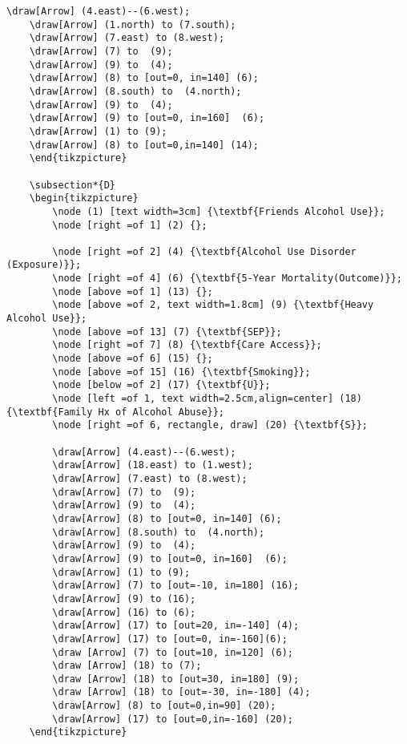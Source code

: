 \documentclass{article}
\begin{document}
\begin{lstlisting}[frame=single, basicstyle=\ttfamily, linewidth=22.5cm]
    \draw[Arrow] (4.east)--(6.west);
    \draw[Arrow] (1.north) to (7.south);
    \draw[Arrow] (7.east) to (8.west);
    \draw[Arrow] (7) to  (9);
    \draw[Arrow] (9) to  (4);
    \draw[Arrow] (8) to [out=0, in=140] (6);
    \draw[Arrow] (8.south) to  (4.north);
    \draw[Arrow] (9) to  (4);
    \draw[Arrow] (9) to [out=0, in=160]  (6);
    \draw[Arrow] (1) to (9);
    \draw[Arrow] (8) to [out=0,in=140] (14);
    \end{tikzpicture}
    
    \subsection*{D}
    \begin{tikzpicture}
        \node (1) [text width=3cm] {\textbf{Friends Alcohol Use}};
        \node [right =of 1] (2) {};
      
        \node [right =of 2] (4) {\textbf{Alcohol Use Disorder (Exposure)}};
        \node [right =of 4] (6) {\textbf{5-Year Mortality(Outcome)}};
        \node [above =of 1] (13) {};
        \node [above =of 2, text width=1.8cm] (9) {\textbf{Heavy Alcohol Use}};
        \node [above =of 13] (7) {\textbf{SEP}};
        \node [right =of 7] (8) {\textbf{Care Access}};
        \node [above =of 6] (15) {};
        \node [above =of 15] (16) {\textbf{Smoking}};
        \node [below =of 2] (17) {\textbf{U}};
        \node [left =of 1, text width=2.5cm,align=center] (18) {\textbf{Family Hx of Alcohol Abuse}};
        \node [right =of 6, rectangle, draw] (20) {\textbf{S}};
    
        \draw[Arrow] (4.east)--(6.west);
        \draw[Arrow] (18.east) to (1.west);
        \draw[Arrow] (7.east) to (8.west);
        \draw[Arrow] (7) to  (9);
        \draw[Arrow] (9) to  (4);
        \draw[Arrow] (8) to [out=0, in=140] (6);
        \draw[Arrow] (8.south) to  (4.north);
        \draw[Arrow] (9) to  (4);
        \draw[Arrow] (9) to [out=0, in=160]  (6);
        \draw[Arrow] (1) to (9);
        \draw[Arrow] (7) to [out=-10, in=180] (16);
        \draw[Arrow] (9) to (16);
        \draw[Arrow] (16) to (6);
        \draw[Arrow] (17) to [out=20, in=-140] (4);
        \draw[Arrow] (17) to [out=0, in=-160](6);
        \draw [Arrow] (7) to [out=10, in=120] (6);
        \draw [Arrow] (18) to (7);
        \draw [Arrow] (18) to [out=30, in=180] (9);
        \draw [Arrow] (18) to [out=-30, in=-180] (4);
        \draw[Arrow] (8) to [out=0,in=90] (20);
        \draw[Arrow] (17) to [out=0,in=-160] (20);
    \end{tikzpicture}
\end{lstlisting}
\end{document}
